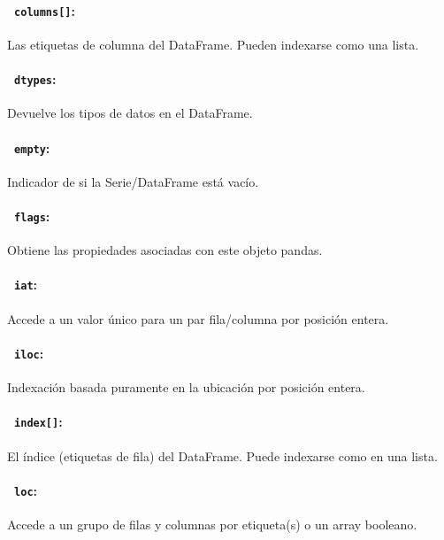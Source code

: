 \paragraph{~\hspace{2em}\texttt{columns[]}:} Las etiquetas de columna del
DataFrame. Pueden indexarse como una lista.

\paragraph{~\hspace{2em}\texttt{dtypes}:} Devuelve los tipos de datos en el
DataFrame.

\paragraph{~\hspace{2em}\texttt{empty}:} Indicador de si la Serie/DataFrame
está vacío.

\paragraph{~\hspace{2em}\texttt{flags}:} Obtiene las propiedades asociadas con
este objeto pandas.

\paragraph{~\hspace{2em}\texttt{iat}:} Accede a un valor único para un par
fila/columna por posición entera.

\paragraph{~\hspace{2em}\texttt{iloc}:} Indexación basada puramente en la
ubicación por posición entera.

\paragraph{~\hspace{2em}\texttt{index[]}:} El índice (etiquetas de fila) del
DataFrame. Puede indexarse como en una lista.

\paragraph{~\hspace{2em}\texttt{loc}:} Accede a un grupo de filas y columnas
por etiqueta(s) o un array booleano.


